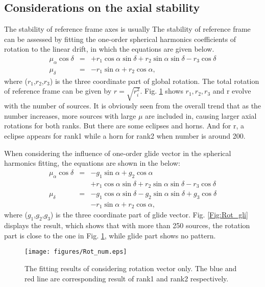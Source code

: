 \documentclass{aa}
\begin{document}
\subsection{Considerations on the axial stability}
The stability of reference frame axes is usually 
The stability of reference frame can be assessed by fitting the one-order spherical harmonics coefficients of rotation to the linear drift, in which the equations are given below.
\begin{eqnarray}
      \mu_{\alpha}\cos\delta & = 
                                & +r_1\cos\alpha\sin\delta +r_2\sin\alpha\sin\delta -r_3\cos\delta \\
      \mu_{\delta}           & = 
      						    & -r_1\sin\alpha + r_2\cos\alpha,
   \end{eqnarray}
   where ($r_1$,$r_2$,$r_3$) is the three coordinate part of global rotation.
The total rotation of reference frame can be given by $r = \sqrt{r_i^2 }$. Fig. \ref{Fig:rot_num} shows $r_1, r_2, r_3$ and r evolve with the number of sources. It is obviously seen from the overall trend that as the number increases, more sources with large $\mu$ are included in, causing larger axial rotations for both ranks. But there are some eclipses and horns. And for r, a eclipse appears for rank1 while a horn for rank2 when number is around 200. 

When considering the influence of one-order glide vector in the spherical harmonics fitting, the equations are shown in the below:
\begin{eqnarray}
      \mu_{\alpha}\cos\delta & = 
                             & -g_1\sin\alpha + g_2\cos\alpha                    \nonumber                                             \\
                         &   & +r_1\cos\alpha\sin\delta +r_2\sin\alpha\sin\delta -r_3\cos\delta                \\
      \mu_{\delta}           & = 
                             & -g_1\cos\alpha\sin\delta -g_2\sin\alpha\sin\delta +g_3\cos\delta  \nonumber     	\\					                     &   & -r_1\sin\alpha + r_2\cos\alpha,
   \end{eqnarray}
   where ($g_1$,$g_2$,$g_3$) is the three coordinate part of glide vector.
%
Fig. \ref{Fig:Rot_gli} displays the result, which shows that with more than 250 sources, the rotation part is close to the one in Fig. \ref{Fig:rot_num}, while glide part shows no pattern.

\begin{figure}
   \centering
   \texttt{[image: figures/Rot\_num.eps]}
      \caption{
      The fitting results of considering rotation vector only. The blue and red line are corresponding result of rank1 and rank2 respectively.
              }
         \label{Fig:rot_num}
\end{figure}
\end{document}
